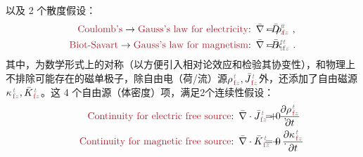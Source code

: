 以及 2 个散度假设：
\begin{subequations} \label{eq:maxwell-db}
\begin{align}
	\textcolor{Maroon}{\text{Coulomb's}} \to \textcolor{Maroon}{\text{Gauss's law for electricity}}\text{:}&\hspace{0.5em} \bar{\nabla} \cdot \bar{D}^{\;\!\textcolor{gray}{t}}_{\;\!\textcolor{gray}{z}} \hspace{-3.2em} &&= {\rho}^{\;\!\textcolor{gray}{t}}_{\;\!\textcolor{Maroon}{\text{f}}\textcolor{gray}{z}}~, \label{eq:maxwell-d} \\ \textcolor{Maroon}{\text{Biot-Savart}} \to \textcolor{Maroon}{\text{Gauss's law for magnetism}}\text{:}&\hspace{0.5em} \bar{\nabla} \cdot \bar{B}^{\;\!\textcolor{gray}{t}}_{\;\!\textcolor{gray}{z}} \hspace{-3.2em} &&= {\kappa}^{\;\!\textcolor{gray}{t}}_{\;\!\textcolor{Maroon}{\text{f}}\textcolor{gray}{z}}~. \label{eq:maxwell-b}
\end{align}
\end{subequations}
其中，为数学形式上的对称（以方便引入相对论效应和检验其协变性\cite{lakhtakiaCovariancesInvariancesMaxwell1995,chen-zhuChenZhuxieUndergraduate_courses2024}），和物理上不排除可能存在的磁单极子，除自由电（荷/流）源${\rho}^{\;\!\textcolor{gray}{t}}_{\;\!\textcolor{Maroon}{\text{f}}\textcolor{gray}{z}}, \bar{J}^{\;\!\textcolor{gray}{t}}_{\;\!\textcolor{Maroon}{\text{f}}\textcolor{gray}{z}}$外，还添加了自由磁源${\kappa}^{\;\!\textcolor{gray}{t}}_{\;\!\textcolor{Maroon}{\text{f}}\textcolor{gray}{z}}, \bar{K}^{\;\!\textcolor{gray}{t}}_{\;\!\textcolor{Maroon}{\text{f}}\textcolor{gray}{z}}$\cite{lakhtakiaCovariancesInvariancesMaxwell1995}。这 4 个自由源（体密度）项，满足2个连续性假设\cite{mackayElectromagneticAnisotropyBianisotropy2019,lakhtakiaCovariancesInvariancesMaxwell1995,chen-zhuChenZhuxieUndergraduate_courses2024}：
\begin{subequations} \label{eq:continuity-pj}
\begin{align}
	\textcolor{Maroon}{\text{Continuity for electric free source}}\text{:}&\hspace{0.5em} \bar{\nabla} \cdot \bar{J}^{\;\!\textcolor{gray}{t}}_{\;\!\textcolor{Maroon}{\text{f}}\textcolor{gray}{z}} + \frac{\partial {\rho}^{\;\!\textcolor{gray}{t}}_{\;\!\textcolor{Maroon}{\text{f}}\textcolor{gray}{z}}}{\partial t} \hspace{-5.2em} &&= 0~, \label{eq:continuity-e} \\ \textcolor{Maroon}{\text{Continuity for magnetic free source}}\text{:}&\hspace{0.5em} \bar{\nabla} \cdot \bar{K}^{\;\!\textcolor{gray}{t}}_{\;\!\textcolor{Maroon}{\text{f}}\textcolor{gray}{z}} + \frac{\partial {\kappa}^{\;\!\textcolor{gray}{t}}_{\;\!\textcolor{Maroon}{\text{f}}\textcolor{gray}{z}}}{\partial t} \hspace{-5.2em} &&= 0~. \label{eq:continuity-m}
\end{align}
\end{subequations}
